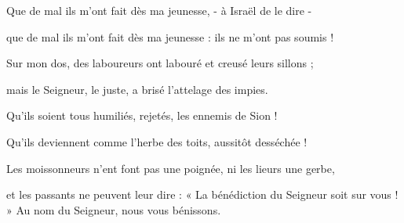 \item Que de mal ils m'ont fait dès ma jeunesse, - à Israël de le dire - 

\item que de mal ils m'ont fait dès ma jeunesse : ils ne m'ont pas soumis !

\item Sur mon dos, des laboureurs ont labouré et creusé leurs sillons ; 

\item mais le Seigneur, le juste, a brisé l'attelage des impies.

\item Qu'ils soient tous humiliés, rejetés, les ennemis de Sion ! 

\item Qu'ils deviennent comme l'herbe des toits, aussitôt desséchée !

\item Les moissonneurs n'ent font pas une poignée, ni les lieurs une gerbe, 

\item et les passants ne peuvent leur dire : « La bénédiction du Seigneur soit sur vous ! » Au nom du Seigneur, nous vous bénissons.